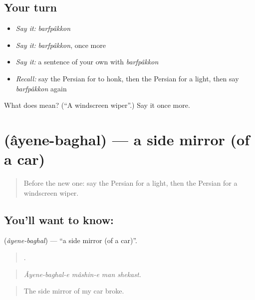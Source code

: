 \subsection*{Your turn}
\begin{itemize}
\raggedright
  \item \emph{Say it:} \emph{barfpâkkon}
  \item \emph{Say it:} \emph{barfpâkkon}, once more
  \item \emph{Say it:} a sentence of your own with \emph{barfpâkkon}
  \item \emph{Recall:} say the Persian for to honk, then the Persian for a light, then say \emph{barfpâkkon} again
\end{itemize}

\begin{tcolorbox}[breakable,colback=teal!4,colframe=teal!35!black,title={Before you move on}]
What does    mean? (\textquotedblleft{}A windscreen wiper\textquotedblright{}.) Say it once more.
\end{tcolorbox}
\section[\texorpdfstring{\fa{آینه} \fa{بغل} (âyene-baghal)}{آینه بغل (âyene-baghal)}]{  (âyene-baghal) — a side mirror (of a car)}

\label{lesson:FA-C421-ayene-baghal}



\begin{quote}
Before the new one: say the Persian for a light, then the Persian for a windscreen wiper.
\end{quote}

\subsection*{You'll want to know:  }
\textbf{ } (\emph{âyene-baghal}) — \textquotedblleft{}a side mirror (of a car)\textquotedblright{}.

\begin{quote}
    .
\end{quote}

\begin{quote}
\emph{Âyene-baghal-e mâshin-e man shekast.}
\end{quote}

\begin{quote}
The side mirror of my car broke.
\end{quote}

